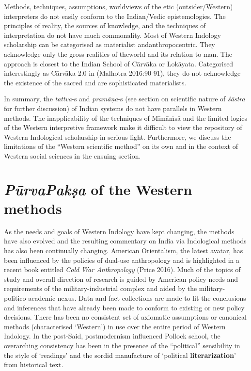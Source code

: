 Methods, techniques, assumptions, worldviews of the etic (outsider/\-Western) interpreters do not easily conform to the Indian/Vedic epistemologies. The principles of reality, the sources of knowledge, and the techniques of interpretation do not have much commonality. Most of Western Indology scholarship can be categorised as materialist and\break anthropocentric. They acknowledge only the gross realities of the\break world and its relation to man. The approach is closest to the Indian School of Cārvāka or Lokāyata. Categorised interestingly as Cārvāka 2.0 in (Malhotra 2016:90-91), they do not acknowledge the existence of the sacred and are sophisticated materialists.

In summary, the {\sl tattva}-s and {\sl pramāṇa}-s (see section on scientific nature of {\sl śāstra} for further discussion) of Indian systems do not have parallels in Western methods. The inapplicability of the techniques of Mīmāṁsā and the limited logics of the Western interpretive framework make it difficult to view the repository of Western Indological scholarship in serious light. Furthermore, we discuss the limitations of the ``Western scientific method'' on its own and in the context of Western social sciences in the ensuing section.

\section*{{{\sl\bfseries PūrvaPakṣa}\relax} of the Western methods}

As the needs and goals of Western Indology have kept changing, the methods have also evolved and the resulting commentary on India via Indological methods has also been continually changing. American Orientalism, the latest avatar, has been influenced by the policies of dual-use anthropology and is highlighted in a recent book entitled {\sl Cold War Anthropology} (Price 2016). Much of the topics of study and overall direction of research is guided by American policy needs and requirements of the military-industrial complex and aided by the military-politico-academic nexus. Data and fact collections are made to fit the conclusions and inferences that have already been made to conform to existing or new policy decisions. There has been no consistent set of axiomatic assumptions or canonical methods (characterised `Western') in use over the entire period of Western Indology. In the post-Said, postmodernism influenced Pollock school, the overarching consistency has been in the presence of the ``political'' sensibility in the style of `readings' and the sordid manufacture of `political {\bf literarization}' from historical text.

